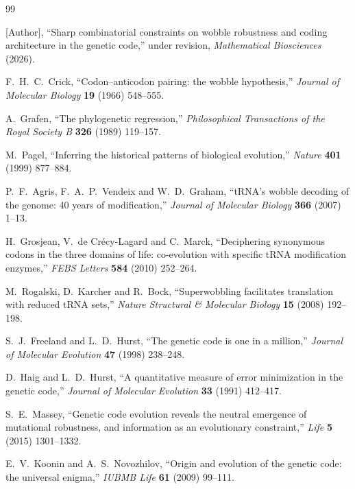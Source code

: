 \documentclass[11pt]{article}
\theoremstyle{remark}
\begin{document}
\begin{thebibliography}{99}

 [Author], ``Sharp combinatorial constraints on wobble
robustness and coding architecture in the genetic code,'' under revision,
\emph{Mathematical Biosciences} (2026).

 F.~H.~C.~Crick, ``Codon--anticodon pairing: the wobble
hypothesis,'' \emph{Journal of Molecular Biology} \textbf{19} (1966) 548--555.

 A.~Grafen, ``The phylogenetic regression,'' \emph{Philosophical
Transactions of the Royal Society B} \textbf{326} (1989) 119--157.

 M.~Pagel, ``Inferring the historical patterns of biological
evolution,'' \emph{Nature} \textbf{401} (1999) 877--884.

 P.~F.~Agris, F.~A.~P.~Vendeix and W.~D.~Graham, ``tRNA's wobble
decoding of the genome: 40 years of modification,'' \emph{Journal of Molecular
Biology} \textbf{366} (2007) 1--13.

 H.~Grosjean, V.~de Cr\'ecy-Lagard and C.~Marck, ``Deciphering
synonymous codons in the three domains of life: co-evolution with specific tRNA
modification enzymes,'' \emph{FEBS Letters} \textbf{584} (2010) 252--264.

 M.~Rogalski, D.~Karcher and R.~Bock, ``Superwobbling
facilitates translation with reduced tRNA sets,'' \emph{Nature Structural \&
Molecular Biology} \textbf{15} (2008) 192--198.

 S.~J.~Freeland and L.~D.~Hurst, ``The genetic code is one in
a million,'' \emph{Journal of Molecular Evolution} \textbf{47} (1998) 238--248.

 D.~Haig and L.~D.~Hurst, ``A quantitative measure of error
minimization in the genetic code,'' \emph{Journal of Molecular Evolution}
\textbf{33} (1991) 412--417.

 S.~E.~Massey, ``Genetic code evolution reveals the neutral
emergence of mutational robustness, and information as an evolutionary
constraint,'' \emph{Life} \textbf{5} (2015) 1301--1332.

 E.~V.~Koonin and A.~S.~Novozhilov, ``Origin and evolution of
the genetic code: the universal enigma,'' \emph{IUBMB Life} \textbf{61} (2009)
99--111.

\end{thebibliography}
\end{document}
